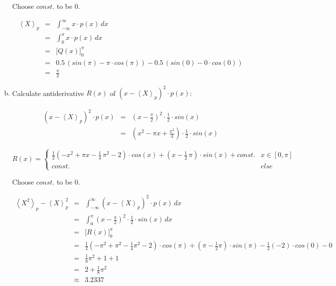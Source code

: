 \documentclass[11pt,a4paper]{article}
\begin{document}
\begin{enumerate}[a)]
Choose $const.$ to be $0$.

\begin{eqnarray*}
\left\langle X \right\rangle_p  &   = & \int_{-\infty}^\infty x \cdot p(x) \, dx\\
                                &   = & \int_0^\pi x \cdot p(x) \, dx\\
                                &   = & \Big[ Q(x) \Big]_0^\pi\\
                                &   = & 0.5 \, (sin(\pi) - \pi \cdot cos(\pi)) - 0.5 \, (sin(0) - 0 \cdot cos(0))\\
                                &   = & \frac{\pi}{2}
\end{eqnarray*}

\item


Calculate antiderivative $R(x)$ of $\left( x - \left\langle X \right\rangle_p \right)^2 \cdot p(x)$:

\begin{eqnarray*}
\left( x - \left\langle X \right\rangle_p \right)^2 \cdot p(x)
&   = & \left( x - \frac{\pi}{2} \right)^2 \cdot \frac{1}{2} \cdot sin(x)\\
&   = & \left( x^2 - \pi x + \frac{\pi^2}{4} \right) \cdot \frac{1}{2} \cdot sin(x)
\end{eqnarray*}

\begin{displaymath}
R(x) = \begin{cases}
\frac{1}{2} \left( -x^2 + \pi x - \frac{1}{4} \, \pi^2 - 2 \right)
\cdot cos(x) + \left( x - \frac{1}{2} \, \pi \right) \cdot sin(x) + const.      & x \in [0, \pi]\\
const.                                                                          & else
\end{cases}
\end{displaymath}

Choose $const.$ to be $0$.

\begin{eqnarray*}
\left\langle X^2 \right\rangle_p - \left\langle X \right\rangle_p^2
&   = & \int_{-\infty}^\infty \left( x - \left\langle X \right\rangle_p \right)^2 \cdot p(x) \, dx\\
&   = & \int_0^\pi \left( x - \frac{\pi}{2} \right)^2 \cdot \frac{1}{2} \cdot sin(x) \, dx\\
&   = & \Big[ R(x) \Big]_0^\pi\\
&   = & \frac{1}{2} \left( -\pi^2 + \pi^2 - \frac{1}{4} \pi^2 - 2 \right) \cdot cos(\pi)
        + \left( \pi - \frac{1}{2} \pi \right) \cdot sin(\pi)
        - \frac{1}{2} (-2) \cdot cos(0) - 0\\
&   = & \frac{1}{8} \pi^2 + 1 + 1\\
&   = & 2 + \frac{1}{8} \pi^2\\
& \approx & 3.2337
\end{eqnarray*}

\end{enumerate}
\end{document}
